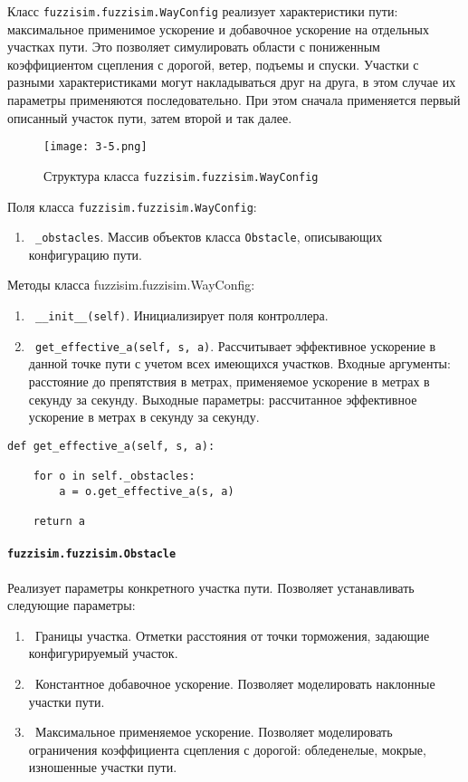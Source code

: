 Класс \lstinline!fuzzisim.fuzzisim.WayConfig! реализует характеристики пути: максимальное применимое ускорение и добавочное ускорение на отдельных участках пути. Это позволяет симулировать области с пониженным коэффициентом сцепления с дорогой, ветер, подъемы и спуски. Участки  с разными характеристиками могут накладываться друг на друга, в этом случае их параметры применяются последовательно. При этом сначала применяется первый описанный участок пути, затем второй и так далее.

\begin{figure}[ht]
	\centering
	\texttt{[image: 3-5.png]}
	\caption{ Структура класса \lstinline!fuzzisim.fuzzisim.WayConfig!}
\end{figure}

Поля класса \lstinline!fuzzisim.fuzzisim.WayConfig!:
\begin{enumerate}[label=\arabic*)]
	\item \lstinline! _obstacles!. Массив объектов класса \lstinline!Obstacle!, описывающих конфигурацию пути.
\end{enumerate}
Методы класса fuzzisim.fuzzisim.WayConfig:
\begin{enumerate}[label=\arabic*)]
	\item \lstinline! __init__(self)!. Инициализирует поля контроллера.
	\item \lstinline! get_effective_a(self, s, a)!.  Рассчитывает эффективное ускорение в данной точке пути с учетом всех имеющихся участков. Входные аргументы: расстояние до препятствия в метрах, применяемое ускорение в метрах в секунду за секунду. Выходные параметры: рассчитанное эффективное ускорение в метрах в секунду за секунду.
\end{enumerate}

\begin{lstlisting}[style=pythonstyle,caption={  }, label=lst:func:1]
	def get_effective_a(self, s, a):

	for o in self._obstacles:
		a = o.get_effective_a(s, a)

	return a
\end{lstlisting}




\paragraph{\lstinline!fuzzisim.fuzzisim.Obstacle!}

Реализует параметры конкретного участка пути. Позволяет устанавливать следующие параметры:
\begin{enumerate}[label=\arabic*)]
	\item \lstinline! !Границы участка. Отметки расстояния от точки торможения, задающие конфигурируемый участок.
	\item \lstinline! !Константное добавочное ускорение. Позволяет моделировать наклонные участки пути.
	\item \lstinline! !Максимальное применяемое ускорение. Позволяет моделировать ограничения коэффициента сцепления с дорогой: обледенелые, мокрые, изношенные участки пути.
\end{enumerate}

